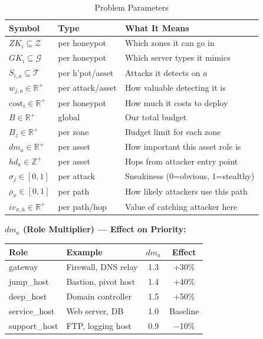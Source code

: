 \documentclass[journal]{IEEEtran}
\newcommand{\calT}{\mathcal{T}}
\newcommand{\calZ}{\mathcal{Z}}
\newcommand{\calG}{\mathcal{G}}
\begin{document}
\begin{table}[htbp]
\caption{Problem Parameters}
\label{tab:params}
\centering
\renewcommand{\arraystretch}{1.2}
\begin{tabular}{@{}lll@{}}
\toprule
\textbf{Symbol} & \textbf{Type} & \textbf{What It Means} \\
\midrule
$ZK_i \subseteq \calZ$        & per honeypot   & Which zones it can go in \\
$GK_i \subseteq \calG$        & per honeypot   & Which server types it mimics \\
$S_{i,a} \subseteq \calT$     & per h'pot/asset& Attacks it detects on $a$ \\
$w_{j,a} \in \mathbb{R}^+$    & per attack/asset& How valuable detecting it is \\
$\mathrm{cost}_i \in \mathbb{R}^+$ & per honeypot & How much it costs to deploy \\
$B \in \mathbb{R}^+$          & global         & Our total budget \\
$B_z \in \mathbb{R}^+$        & per zone       & Budget limit for each zone \\
$dm_a \in \mathbb{R}^+$       & per asset      & How important this asset role is \\
$hd_a \in \mathbb{Z}^+$       & per asset      & Hops from attacker entry point \\
$\sigma_j \in [0,1]$          & per attack     & Sneakiness (0=obvious, 1=stealthy) \\
$\rho_\pi \in [0,1]$          & per path       & How likely attackers use this path \\
$iv_{\pi,h} \in \mathbb{R}^+$ & per path/hop   & Value of catching attacker here \\
\bottomrule
\end{tabular}
\end{table}

\begin{examplebox}
\textbf{$dm_a$ (Role Multiplier) --- Effect on Priority:}
\begin{center}
\small
\renewcommand{\arraystretch}{1.1}
\begin{tabular}{@{}llcc@{}}
\toprule
\textbf{Role} & \textbf{Example} & $dm_a$ & \textbf{Effect} \\
\midrule
gateway      & Firewall, DNS relay & 1.3 & +30\% \\
jump\_host   & Bastion, pivot host & 1.4 & +40\% \\
deep\_host   & Domain controller   & 1.5 & +50\% \\
service\_host& Web server, DB      & 1.0 & Baseline \\
support\_host& FTP, logging host   & 0.9 & $-$10\% \\
\bottomrule
\end{tabular}
\end{center}
\end{examplebox}
\end{document}

